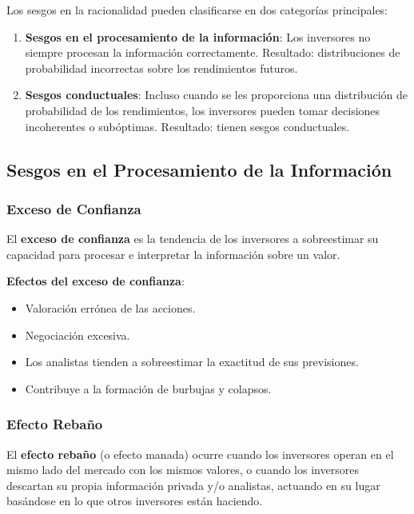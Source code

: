 Los sesgos en la racionalidad pueden clasificarse en dos categorías principales:

\begin{enumerate}
\item \textbf{Sesgos en el procesamiento de la información}: Los inversores no siempre procesan la información correctamente. Resultado: distribuciones de probabilidad incorrectas sobre los rendimientos futuros.

\item \textbf{Sesgos conductuales}: Incluso cuando se les proporciona una distribución de probabilidad de los rendimientos, los inversores pueden tomar decisiones incoherentes o subóptimas. Resultado: tienen sesgos conductuales.
\end{enumerate}

\subsection{Sesgos en el Procesamiento de la Información}

\subsubsection{Exceso de Confianza}

\begin{definicion}
El \textbf{exceso de confianza} es la tendencia de los inversores a sobreestimar su capacidad para procesar e interpretar la información sobre un valor.
\end{definicion}

\textbf{Efectos del exceso de confianza}:
\begin{itemize}
\item Valoración errónea de las acciones.
\item Negociación excesiva.
\item Los analistas tienden a sobreestimar la exactitud de sus previsiones.
\item Contribuye a la formación de burbujas y colapsos.
\end{itemize}

\subsubsection{Efecto Rebaño}

\begin{definicion}
El \textbf{efecto rebaño} (o efecto manada) ocurre cuando los inversores operan en el mismo lado del mercado con los mismos valores, o cuando los inversores descartan su propia información privada y/o analistas, actuando en su lugar basándose en lo que otros inversores están haciendo.
\end{definicion}

